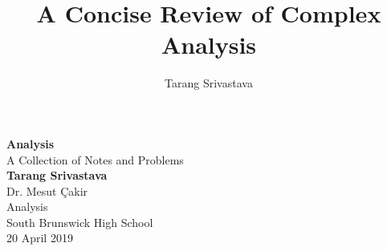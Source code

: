 \documentclass[12pt, letterpaper, twocolumn]{report}
\author{Tarang Srivastava}
\title{A Concise Review of Complex Analysis }
\theoremstyle{definition}
\begin{document}
    \begin{titlepage}
        \begin{center}
			\vspace*{1cm}
			\Huge
			\textbf{Analysis}\\
			\vspace{0.5cm}
			\LARGE
			A Collection of Notes and Problems\\
			\vspace{1.5cm}
			\textbf{Tarang Srivastava}\\
			\vfill
			\vspace{0.8cm}
			\Large
			Dr. Mesut \c{C}akir\\
			Analysis\\
			South Brunswick High School\\
			20 April 2019
		\end{center}
    \end{titlepage}

    \tableofcontents

    
\end{document}
